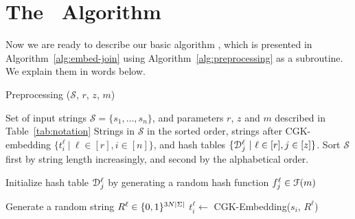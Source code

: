 \section{The \ebdjoin\ Algorithm}
\label{sec:algo}

\label{sec:embed}

Now we are ready to describe our basic algorithm \ebdjoin, which is presented in Algorithm~\ref{alg:embed-join} using Algorithm~\ref{alg:preprocessing} as a subroutine. We explain them in words below.

\begin{algorithm}[t]
\caption{Preprocessing ($\mathcal{S}$, $r$, $z$, $m$)}
\label{alg:preprocessing}
\begin{algorithmic}[1]
\Require Set of input strings $\mathcal{S} = \{s_1, \ldots, s_n\}$, and parameters $r$, $z$ and $m$ described in Table~\ref{tab:notation}
\Ensure  Strings in $\mathcal{S}$ in the sorted order, strings after CGK-embedding $\{t_i^\ell\ |\ \ell \in [r], i \in [n]\}$, and hash tables $\{\mathcal{D}_j^{\ell} \ |\ \ell \in [r], j \in [z]\}$.
\State Sort $\mathcal{S}$ first by string length increasingly, and second by the alphabetical order. 

\ForEach{$\ell \in [r]$}
	\State Initialize hash table $\mathcal{D}_j^{\ell} $ by generating a random hash function $f_j^{\ell} \in \mathcal{F}(m)$  
	\EndFor
\EndFor

\ForEach{$\ell \in [r]$}
\State Generate a random string $R^{\ell} \in \{0,1\}^{3 N \left| \Sigma \right|}$
\State $t_i^{\ell}  \leftarrow $ CGK-Embedding($s_i$, $R^{\ell}$) 
\EndFor
\EndFor
\end{algorithmic}
\end{algorithm}


